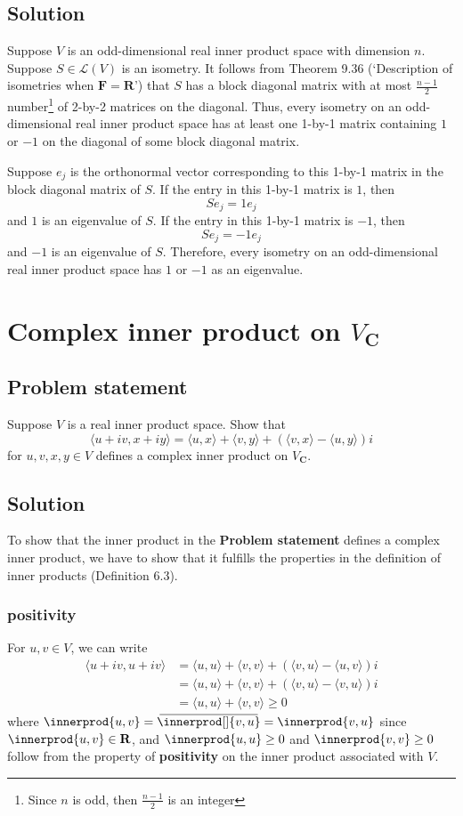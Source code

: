 \documentclass{article}
\DeclarePairedDelimiter{\innerprod}\langle\rangle
\newcommand\conjinnerp[2][]{\:\overline{\mkern-4mu\innerprod[#1]{#2}\mkern-4mu}\:}
\begin{document}
\subsection*{Solution}
Suppose $V$ is an odd-dimensional real inner product space with dimension $n$. 
Suppose $S\in\mathcal{L}(V)$ is an isometry. 
It follows from Theorem 9.36 (`Description of isometries when $\mathbf{F}=\mathbf{R}$') that $S$ has a block diagonal matrix with at most $\frac{n-1}{2}$ number\footnote{Since $n$ is odd, then $\frac{n-1}{2}$ is an integer} of 2-by-2 matrices on the diagonal. 
Thus, every isometry on an odd-dimensional real inner product space has at least one 1-by-1 matrix containing $1$ or $-1$ on the diagonal of some block diagonal matrix. 

Suppose $e_j$ is the orthonormal vector corresponding to this 1-by-1 matrix in the block diagonal matrix of $S$. 
If the entry in this 1-by-1 matrix is $1$, then 
\[Se_j=1e_j\]
and $1$ is an eigenvalue of $S$. 
If the entry in this 1-by-1 matrix is $-1$, then
\[Se_j=-1e_j\]
and $-1$ is an eigenvalue of $S$. 
Therefore, every isometry on an odd-dimensional real inner product space has $1$ or $-1$ as an eigenvalue.

\clearpage

\section{Complex inner product on $V_{\mathbf{C}}$}
\subsection*{Problem statement}
Suppose $V$ is a real inner product space. 
Show that 
\[\langle u+iv,x+iy\rangle=\langle u,x\rangle +\langle v,y\rangle + (\langle v,x\rangle - \langle u,y\rangle)i\]
for $u,v,x,y\in V$ defines a complex inner product on $V_{\mathbf{C}}$.

\subsection*{Solution}
To show that the inner product in the \textbf{Problem statement} defines a complex inner product, we have to show that it fulfills the properties in the definition of inner products (Definition 6.3).

\subsubsection*{positivity}
For $u,v\in V$, we can write
\begin{align*}
    \langle u+iv,u+iv\rangle&=\langle u,u\rangle +\langle v,v\rangle + (\langle v,u\rangle - \langle u,v\rangle)i\\
    &=\langle u,u\rangle +\langle v,v\rangle + (\langle v,u\rangle - \langle v,u\rangle)i\\
    &=\langle u,u\rangle +\langle v,v\rangle \geq 0
\end{align*}
where $\innerprod{u,v}=\conjinnerp{v,u}=\innerprod{v,u}$ since $\innerprod{u,v}\in\mathbf{R}$, and $\innerprod{u,u}\geq0$ and $\innerprod{v,v}\geq0$ follow from the property of \textbf{positivity} on the inner product associated with $V$.
\end{document}
